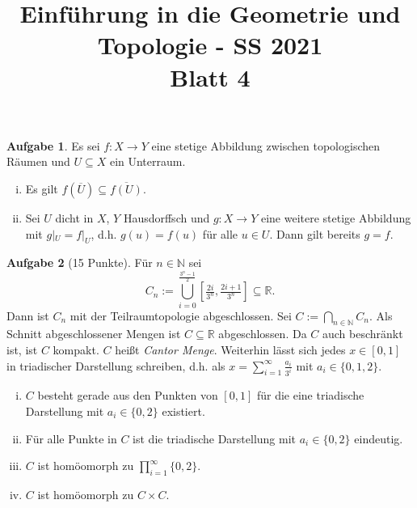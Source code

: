 \documentclass{article}
\title{Einführung in die Geometrie und Topologie - SS 2021\\
Blatt 4}
\date{}
\theoremstyle{definition}
\newtheorem{aufgabe}{Aufgabe}
\theoremstyle{remark}
\newcommand{\N}{\mathbb{N}}
\newcommand{\R}{\mathbb{R}}
\begin{document}
\maketitle
\thispagestyle{fancy}
\cfoot{}
\renewcommand{\headrulewidth}{0pt}
\renewcommand{\footrulewidth}{0.4pt}

\begin{aufgabe} Es sei $f\colon X\to Y$ eine stetige Abbildung zwischen topologischen Räumen und $U\subseteq X$ ein Unterraum.
\begin{enumerate}[i)]
	\item Es gilt $f(\overline{U})\subseteq\overline{f(U)}$.
	\item Sei $U$ dicht in $X$, $Y$ Hausdorffsch und $g\colon X\to Y$ eine weitere stetige Abbildung mit $g|_U=f|_U$, d.h. $g(u)=f(u)$ für alle $u\in U$. Dann gilt bereits $g=f$.
\end{enumerate}
\end{aufgabe}
\begin{aufgabe}[15 Punkte] Für $n\in\N$ sei \[C_n:=\bigcup_{i=0}^{\frac{3^n-1}{2}}[\tfrac{2i}{3^n},\tfrac{2i+1}{3^n}]\subseteq \R.\] Dann ist $C_n$ mit der Teilraumtopologie abgeschlossen. Sei $C:=\bigcap_{n\in\N}C_n$. Als Schnitt abgeschlossener Mengen ist $C\subseteq \R$ abgeschlossen. Da $C$ auch beschränkt ist, ist $C$ kompakt. $C$ heißt \emph{Cantor Menge}. Weiterhin lässt sich jedes $x\in[0,1]$ in triadischer Darstellung schreiben, d.h. als $x=\sum_{i=1}^\infty\tfrac{a_i}{3^i}$ mit $a_i\in\{0,1,2\}$.
\begin{enumerate}[i)]
	\item $C$ besteht gerade aus den Punkten von $[0,1]$ für die eine triadische Darstellung mit $a_i\in\{0,2\}$ existiert.
	\item Für alle Punkte in $C$ ist die triadische Darstellung mit $a_i\in\{0,2\}$ eindeutig.
	\item $C$ ist homöomorph zu $\prod_{i=1}^\infty\{0,2\}$.
	\item $C$ ist homöomorph zu $C\times C$.
\end{enumerate}
\end{aufgabe}
\end{document}
